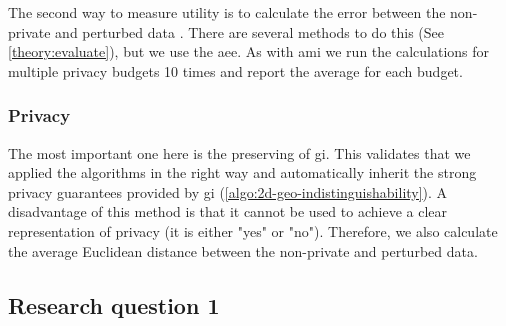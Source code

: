 The second way to measure utility is to calculate the error between the non-private and perturbed data \citep{9679364,sun_distributed_2019,xia_distributed_2020-1}.
There are several methods to do this (See \ref{theory:evaluate}), but we use the \gls{aee}.
As with \gls{ami} we run the calculations for multiple privacy budgets 10 times and report the average for each budget.

\subsubsection{Privacy}
The most important one here is the preserving of \gls{gi}.
This validates that we applied the algorithms in the right way and automatically inherit the strong privacy guarantees provided by \gls{gi} (\ref{algo:2d-geo-indistinguishability}).
A disadvantage of this method is that it cannot be used to achieve a clear representation of privacy (it is either "yes" or "no").
Therefore, we also calculate the average Euclidean distance between the non-private and perturbed data.

\subsection{Research question 1}

